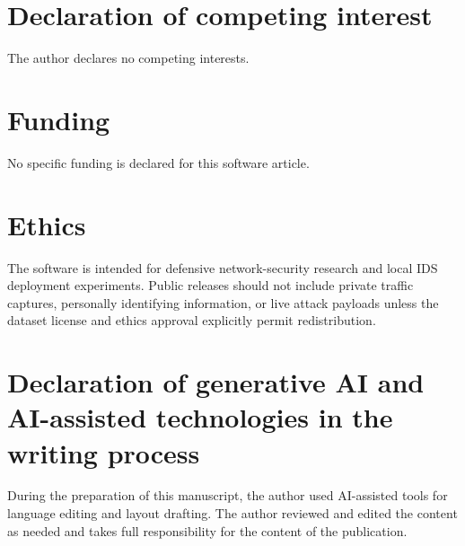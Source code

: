 \section*{Declaration of competing interest}

The author declares no competing interests.

\section*{Funding}

No specific funding is declared for this software article.

\section*{Ethics}

The software is intended for defensive network-security research and local IDS deployment experiments. Public releases should not include private traffic captures, personally identifying information, or live attack payloads unless the dataset license and ethics approval explicitly permit redistribution.

\section*{Declaration of generative AI and AI-assisted technologies in the writing process}

During the preparation of this manuscript, the author used AI-assisted tools for language editing and layout drafting. The author reviewed and edited the content as needed and takes full responsibility for the content of the publication.
